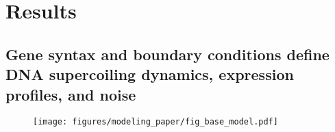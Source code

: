 \documentclass[11pt]{article}
\begin{document}
\FloatBarrier
\section{Results}
\FloatBarrier

\subsection{Gene syntax and boundary conditions define DNA supercoiling dynamics, expression profiles, and noise}
\begin{figure}[ht]
    \centering
    {\texttt{[image: figures/modeling\_paper/fig\_base\_model.pdf]}
    \label{fig:base_orientations}
    \label{fig:bc_induction_sweep}
    \label{fig:circular_bc_distributions}
    \label{fig:linear_bc_distributions}
    \label{fig:base_model_sc_density}
    \label{fig:reporter_output_by_spacing_fold_induction}}
\end{figure}
\end{document}
